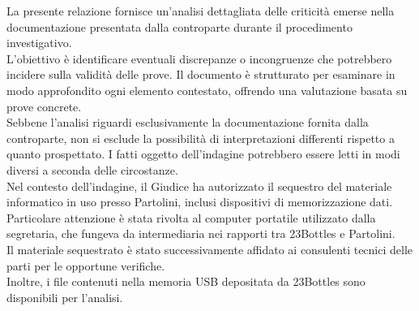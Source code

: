 La presente relazione fornisce un’analisi dettagliata delle criticità emerse nella documentazione presentata dalla controparte durante il procedimento investigativo.\\
L’obiettivo è identificare eventuali discrepanze o incongruenze che potrebbero incidere sulla validità delle prove. Il documento è strutturato per esaminare in modo approfondito ogni elemento contestato, offrendo una valutazione basata su prove concrete.\vspace{14pt}\\
Sebbene l’analisi riguardi esclusivamente la documentazione fornita dalla controparte, non si esclude la possibilità di interpretazioni differenti rispetto a quanto prospettato. I fatti oggetto dell’indagine potrebbero essere letti in modi diversi a seconda delle circostanze.\\
Nel contesto dell’indagine, il Giudice ha autorizzato il sequestro del materiale informatico in uso presso Partolini, inclusi dispositivi di memorizzazione dati. Particolare attenzione è stata rivolta al computer portatile utilizzato dalla segretaria, che fungeva da intermediaria nei rapporti tra 23Bottles e Partolini.\\
Il materiale sequestrato è stato successivamente affidato ai consulenti tecnici delle parti per le opportune verifiche.\\
Inoltre, i file contenuti nella memoria USB depositata da 23Bottles sono disponibili per l’analisi.
\vspace{14pt}\\